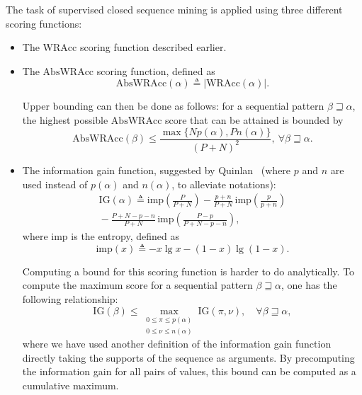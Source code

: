 \documentclass{sigkddExp}
\newcommand{\abs}[1]{|#1|}
\newcommand{\wracc}{\mathrm{WRAcc}}
\newcommand{\abswracc}{\mathrm{AbsWRAcc}}
\newcommand{\ig}{\mathrm{IG}}
\newcommand{\imp}{\mathrm{imp}}
\begin{document}
The task of supervised closed sequence mining is applied using three different scoring functions:
\begin{itemize}
	\item The \(\wracc\) scoring function described earlier.
	\item The \(\abswracc\) scoring function, defined as
	\begin{equation}
	\abswracc(\alpha) \triangleq \abs{\wracc(\alpha)}.
	\end{equation}
	
	Upper bounding can then be done as follows: for a sequential pattern \(\beta \sqsupseteq \alpha\), the highest possible \(\abswracc\) score that can be attained is bounded by
	\begin{equation}
	\abswracc(\beta) \leqslant \frac{\max\{N p(\alpha), P n(\alpha)\}}{(P + N)^2}, \ \forall \beta \sqsupseteq \alpha.
	\end{equation}
	\item The information gain function, suggested by Quinlan~\cite{Quinlan1986} (where \(p\) and \(n\) are used instead of \(p(\alpha)\) and \(n(\alpha)\), to alleviate notations):
	\begin{multline}
	\ig(\alpha) \triangleq \imp\left(\frac{P}{P + N}\right) - \frac{p + n}{P + N}\, \imp\left(\frac{p}{p + n}\right) \\
	{} - \frac{P + N - p - n}{P + N}\, \imp\left(\frac{P - p}{P + N - p - n}\right),
	\end{multline}
	where \(\imp\) is the entropy, defined as
	\begin{equation}
	\imp(x) \triangleq - x \lg x - (1-x) \lg (1-x).
	\end{equation}
	
	Computing a bound for this scoring function is harder to do analytically.
	To compute the maximum score for a sequential pattern \(\beta \sqsupseteq \alpha\), one has the following relationship:
	\begin{equation}
	\ig(\beta) \leqslant \max_{\substack{0 \leqslant \pi \leqslant p(\alpha) \\ 0 \leqslant \nu \leqslant n(\alpha)}} \ig(\pi, \nu), \quad \forall \beta \sqsupseteq \alpha,
	\end{equation}
	where we have used another definition of the information gain function directly taking the supports of the sequence as arguments.
	By precomputing the information gain for all pairs of values, this bound can be computed as a cumulative maximum.
\end{itemize}
\end{document}

